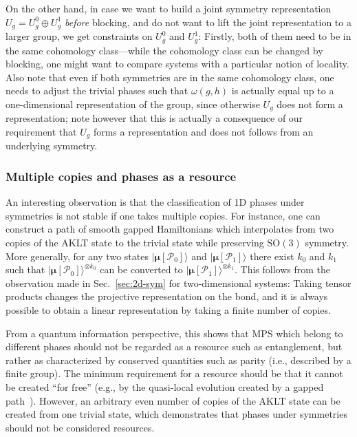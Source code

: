 \documentclass[twocolumn,superscriptaddress,prb,linenumbers]{revtex4-1}
\newcommand{\MPS}[1]{| {\bm\mu}[#1]\rangle}
\newcommand{\mc}[1]{\mathcal{#1}}
\begin{document}
On the other hand, in case we want to build a joint symmetry
representation $U_g=U_g^0\oplus U_g^1$ \emph{before} blocking, and do not
want to lift the joint representation to a larger group, we get
constraints on $U_g^0$ and $U_g^1$: Firstly, both of them need to be in
the same cohomology class---while the cohomology class can be changed by
blocking, one might want to compare systems with a particular notion of
locality. Also note that even if both symmetries are in the same
cohomology class, one needs to adjust the trivial phases such that
$\omega(g,h)$ is actually equal up to a one-dimensional representation of
the group, since otherwise $U_g$ does not form a representation;  note
however that this is actually a consequence of our requirement that $U_g$
forms a representation and does not follows from an underlying symmetry.


\subsubsection{Multiple copies and phases as a resource}

An interesting observation is that the classification of 1D phases under
symmetries is not stable if one takes multiple copies. For instance, one
can construct a path of smooth gapped Hamiltonians which interpolates from
two copies of the AKLT state to the trivial state while preserving
$\mathrm{SO}(3)$ symmetry. More generally, for any two states
$\MPS{\mc P_0}$ and $\MPS{\mc P_1}$ there exist $k_0$ and $k_1$ such that
$\MPS{\mc P_0}^{\otimes k_0}$ can be converted to $\MPS{\mc P_1}^{\otimes
        k_1}$. This follows from the observation made in Sec.~\ref{sec:2d-sym} for
two-dimensional systems: Taking tensor products changes the projective
representation on the bond, and it is always possible to obtain
a linear representation by taking a finite number of copies.


From a quantum information perspective, this shows that MPS which belong
to different phases should not be regarded as a resource such as
entanglement, but rather as characterized by conserved quantities such as
parity (i.e., described by a finite group). The minimum requirement
for a resource should be that it cannot be created ``for free'' (e.g., by
the quasi-local evolution created by a gapped
path~\cite{hastings:quasi-adiabatic}). However,  an arbitrary
even number of copies of the AKLT state can be created from one trivial
state, which demonstrates that phases under symmetries should not be
considered resources.
\end{document}
